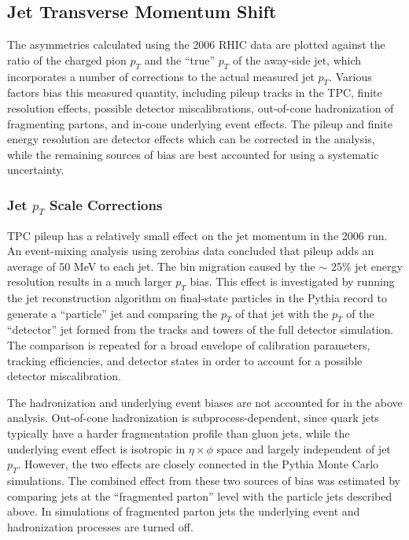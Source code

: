 \subsection{Jet Transverse Momentum Shift}

The asymmetries calculated using the 2006 RHIC data are plotted against the
ratio of the charged pion \(p_{T}\) and the ``true'' \(p_{T}\) of the away-side
jet, which incorporates a number of corrections to the actual measured jet
\(p_T\). Various factors bias this measured quantity, including pileup tracks in
the TPC, finite resolution effects, possible detector miscalibrations,
out-of-cone hadronization of fragmenting partons, and in-cone underlying event
effects. The pileup and finite energy resolution are detector effects which can
be corrected in the analysis, while the remaining sources of bias are best
accounted for using a systematic uncertainty.

\subsubsection{Jet $p_T$ Scale Corrections}

TPC pileup has a relatively small effect on the jet momentum in the 2006 run. An
event-mixing analysis using zerobias data concluded that pileup adds an average
of 50 MeV to each jet. The bin migration caused by the $\sim$ 25\% jet energy
resolution results in a much larger \(p_T\) bias. This effect is investigated by
running the jet reconstruction algorithm on final-state particles in the Pythia
record to generate a ``particle'' jet and comparing the \(p_{T}\) of that jet
with the \(p_{T}\) of the ``detector'' jet formed from the tracks and towers of
the full detector simulation. The comparison is repeated for a broad envelope of
calibration parameters, tracking efficiencies, and detector states in order to
account for a possible detector miscalibration.

The hadronization and underlying event biases are not accounted for in the above
analysis. Out-of-cone hadronization is subprocess-dependent, since quark jets
typically have a harder fragmentation profile than gluon jets, while the
underlying event effect is isotropic in \(\eta \times \phi\) space and largely
independent of jet \(p_T\). However, the two effects are closely connected in
the Pythia Monte Carlo simulations. The combined effect from these two sources
of bias was estimated by comparing jets at the ``fragmented parton'' level with
the particle jets described above. In simulations of fragmented parton jets the
underlying event and hadronization processes are turned off.

